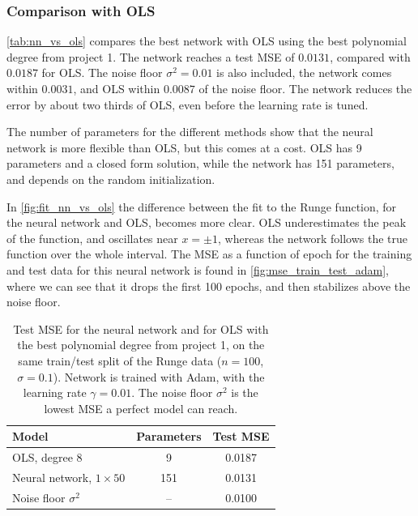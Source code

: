 \documentclass[reprint,english,notitlepage, floatfix]{revtex4-2}  %
\begin{document}
\subsubsection{Comparison with OLS}

\autoref{tab:nn_vs_ols} compares the best network with OLS using the best polynomial degree from project 1. The network reaches a test MSE of $0.0131$, compared with $0.0187$ for OLS. The noise floor $\sigma^2 = 0.01$ is also included, the network comes within $0.0031$, and OLS within $0.0087$ of the noise floor. The network reduces the error by about two thirds of OLS, even before the learning rate is tuned.

The number of parameters for the different methods show that the neural network is more flexible than OLS, but this comes at a cost. OLS has 9 parameters and a closed form solution, while the network has 151 parameters, and depends on the random initialization. 

In \autoref{fig:fit_nn_vs_ols} the difference between the fit to the Runge function, for the neural network and OLS, becomes more clear. OLS underestimates the peak of the function, and oscillates near $x = \pm 1$, whereas the network follows the true function over the whole interval. The MSE as a function of epoch for the training and test data for this neural network is found in \autoref{fig:mse_train_test_adam}, where we can see that it drops the first 100 epochs, and then stabilizes above the noise floor. 

\begin{table}[htbp]
    \centering
    \caption{Test MSE for the neural network and for OLS with the best polynomial degree
    from project 1, on the same train/test split of the Runge data ($n = 100$, $\sigma = 0.1$). Network is trained with Adam, with the learning rate $\gamma = 0.01$.
    The noise floor $\sigma^2$ is the lowest MSE a perfect model can reach.}
    \label{tab:nn_vs_ols}
    \begin{tabular}{lcc}
        \toprule
        Model & Parameters & Test MSE \\
        \midrule
        OLS, degree 8                                    & 9   & 0.0187 \\
        Neural network, $1 \times 50$ & 151 & 0.0131 \\
        \midrule
        Noise floor $\sigma^2$                           & --  & 0.0100 \\
        \bottomrule
    \end{tabular}
\end{table}
\end{document}
